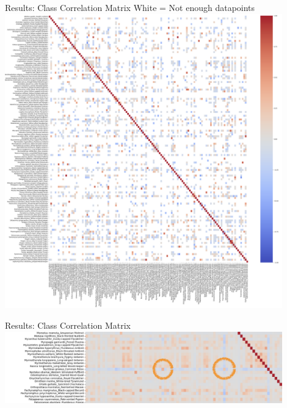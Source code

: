 \begin{frame}{Results: Class Correlation Matrix}
    \centering
    White = Not enough datapoints
    \\
    \centering
    \includegraphics[height=0.9\textheight,width=0.9\textwidth,keepaspectratio]{images/occurance_filter.png}   
\end{frame}

\begin{frame}{Results: Class Correlation Matrix}
    \centering
    \includegraphics[height=0.9\textheight,width=0.9\textwidth,keepaspectratio]{images/night.png}   
\end{frame}

